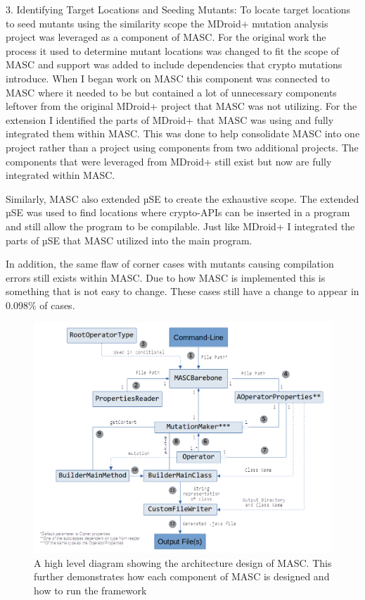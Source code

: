 3. Identifying Target Locations and Seeding Mutants: To locate target locations to seed mutants using the similarity scope the MDroid+ mutation analysis project was leveraged as a component of MASC. For the original work the process it used to determine mutant locations was changed to fit the scope of MASC and support was added to include dependencies that crypto mutations introduce. When I began work on MASC this component was connected to MASC where it needed to be but contained a lot of unnecessary components leftover from the original MDroid+ project that MASC was not utilizing. For the extension I identified the parts of MDroid+ that MASC was using and fully integrated them within MASC. This was done to help consolidate MASC into one project rather than a project using components from two additional projects. The components that were leveraged from MDroid+ still exist but now are fully integrated within MASC.

Similarly, MASC also extended µSE to create the exhaustive scope. The extended µSE was used to find locations where crypto-APIs can be inserted in a program and still allow the program to be compilable. Just like MDroid+ I integrated the parts of µSE that MASC utilized into the main program. 

In addition, the same flaw of corner cases with mutants causing compilation errors still exists within MASC. Due to how MASC is implemented this is something that is not easy to change. These cases still have a change to appear in 0.098\% of cases.

\begin{figure}[!ht]
	\centering
    \includegraphics[width=0.96\linewidth]{figures/architecture.png}
	\vspace{-1.em}
    \caption{\small A high level diagram showing the architecture design of MASC. This further demonstrates how each component of MASC is designed and how to run the framework}
    \label{fig:architecture}
	
\end{figure}



